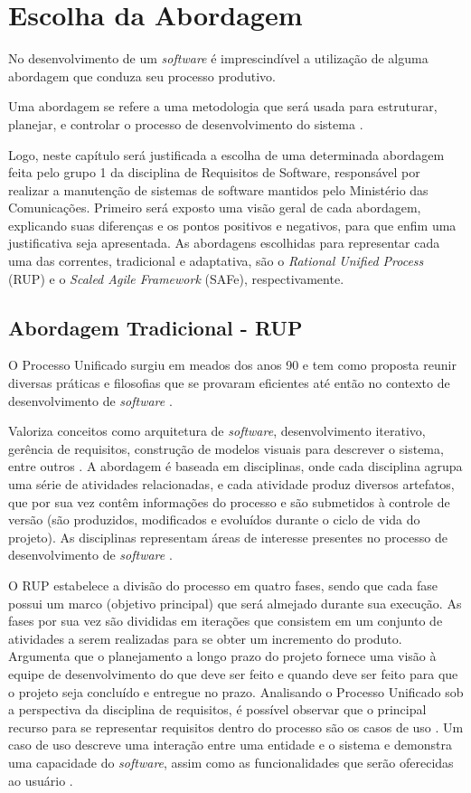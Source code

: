 \chapter[Escolha da Abordagem]{Escolha da Abordagem}
No desenvolvimento de um \emph{software} é imprescindível a utilização de alguma abordagem que conduza seu processo produtivo.

Uma abordagem se refere a uma metodologia que será usada para estruturar, planejar, e controlar o processo de desenvolvimento do sistema \cite{CMS001}.

Logo, neste capítulo será justificada a escolha de uma determinada abordagem feita pelo grupo 1 da disciplina de Requisitos de Software, responsável por realizar a manutenção de sistemas de software mantidos pelo Ministério das Comunicações. Primeiro será exposto uma visão geral de cada abordagem, explicando suas diferenças e os pontos positivos e negativos, para que enfim uma justificativa seja apresentada. As abordagens escolhidas para representar cada uma das correntes, tradicional e adaptativa, são o \emph{Rational Unified Process} (RUP) e o \emph{Scaled Agile Framework} (SAFe), respectivamente.

\section{Abordagem Tradicional - RUP}
O Processo Unificado surgiu em meados dos anos 90 e tem como proposta reunir diversas práticas e filosofias que se provaram eficientes até então no contexto de desenvolvimento de \emph{software} \cite[p. 45]{kruchten001}.

Valoriza conceitos como arquitetura de \emph{software}, desenvolvimento iterativo, gerência de requisitos, construção de modelos visuais para descrever o sistema, entre outros \cite[p. 45]{kruchten001}. A abordagem é baseada em disciplinas, onde cada disciplina agrupa uma série de atividades relacionadas, e cada atividade produz diversos artefatos, que por sua vez contêm informações do processo e são submetidos à controle de versão (são produzidos, modificados e evoluídos durante o ciclo de vida do projeto). As disciplinas representam áreas de interesse presentes no processo de desenvolvimento de \emph{software} \cite[p. 45]{kruchten001}.

O RUP estabelece a divisão do processo em quatro fases, sendo que cada fase possui um marco (objetivo principal) que será almejado durante sua execução. As fases por sua vez são divididas em iterações que consistem em um conjunto de atividades a serem realizadas para se obter um incremento do produto. Argumenta que o planejamento a longo prazo do projeto fornece uma visão à equipe de desenvolvimento do que deve ser feito e quando deve ser feito para que o projeto seja concluído e entregue no prazo. Analisando o Processo Unificado sob a perspectiva da disciplina de requisitos, é possível observar que o principal recurso para se representar requisitos dentro do processo são os casos de uso \cite[p. 45]{kruchten001}. Um caso de uso descreve uma interação entre uma entidade e o sistema e demonstra uma capacidade do \emph{software}, assim como as funcionalidades que serão oferecidas ao usuário \cite[p. 124-125]{kruchten001}.

